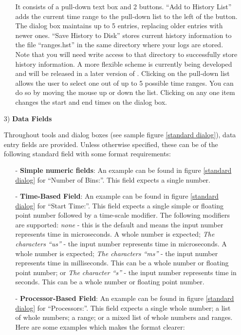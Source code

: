 \documentclass[10pt]{article}
\begin{document}
\begin{itemize}
\begin{itemize}
It consists of a pull-down text box and 2 buttons. ``Add to History
List'' adds the current time range to the pull-down list to the left
of the button. The dialog box maintains up to 5 entries, replacing
older entries with newer ones. ``Save History to Disk'' stores current
history information to the file ``ranges.hst'' in the same directory
where your logs are stored. Note that you will need write access to
that directory to successfully store history information. A more
flexible scheme is currently being developed and will be released in a
later version of \projections{}. Clicking on the pull-down list allows
the user to select one out of up to 5 possible time ranges. You can do
so by moving the mouse up or down the list. Clicking on any one item
changes the start and end times on the dialog box.
\end{itemize}

\item[3)]
{\bf Data Fields}

Throughout \projections{} tools and dialog boxes (see sample figure
\ref{standard dialog}), data entry fields are provided. Unless
otherwise specified, these can be of the following standard field with
some format requirements:

\begin{itemize}
\item[-] {\bf Simple numeric fields}: An example can be found in
figure \ref{standard dialog} for ``Number of Bins:''. This field expects
a single number.
\item[-] {\bf Time-Based Field}: An example can be found in figure
\ref{standard dialog} for ``Start Time:''. This field expects a single
simple or floating point number followed by a time-scale modifier. The
following modifiers are supported: {\it none} - this is the default
and means the input number represents time in microseconds. A whole
number is expected; {\it The characters ``us''} - the input number
represents time in microseconds. A whole number is expected; {\it The
characters ``ms''} - the input number represents time in
milliseconds. This can be a whole number or floating point number; or
{\it The character ``s''} - the input number represents time in
seconds. This can be a whole number or floating point number.
\item[-] {\bf Processor-Based Field}: An example can be found in
figure \ref{standard dialog} for ``Processors:''. This field expects a
single whole number; a list of whole numbers; a range; or a mixed list
of whole numbers and ranges. Here are some examples which makes the
format clearer:


\end{itemize}
\end{itemize}
\end{document}
